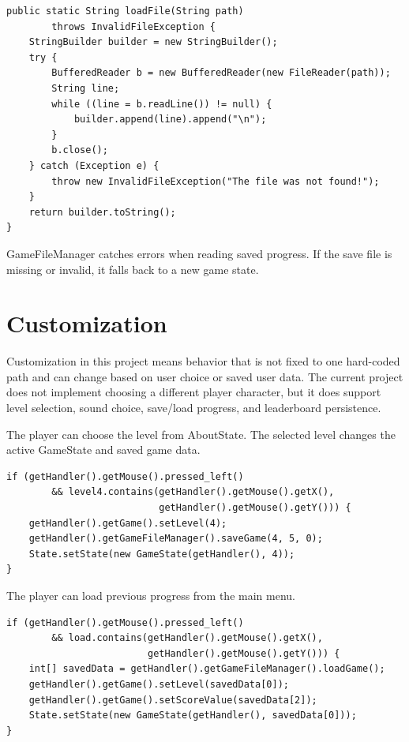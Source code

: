 \documentclass[12pt,a4paper]{article}
\begin{document}
\begin{lstlisting}
public static String loadFile(String path)
        throws InvalidFileException {
    StringBuilder builder = new StringBuilder();
    try {
        BufferedReader b = new BufferedReader(new FileReader(path));
        String line;
        while ((line = b.readLine()) != null) {
            builder.append(line).append("\n");
        }
        b.close();
    } catch (Exception e) {
        throw new InvalidFileException("The file was not found!");
    }
    return builder.toString();
}
\end{lstlisting}

GameFileManager catches errors when reading saved progress. If the save file is missing or invalid, it falls back to a new game state.


\section*{Customization}
Customization in this project means behavior that is not fixed to one hard-coded path and can change based on user choice or saved user data. The current project does not implement choosing a different player character, but it does support level selection, sound choice, save/load progress, and leaderboard persistence.

The player can choose the level from AboutState. The selected level changes the active GameState and saved game data.

\begin{lstlisting}
if (getHandler().getMouse().pressed_left()
        && level4.contains(getHandler().getMouse().getX(),
                           getHandler().getMouse().getY())) {
    getHandler().getGame().setLevel(4);
    getHandler().getGameFileManager().saveGame(4, 5, 0);
    State.setState(new GameState(getHandler(), 4));
}
\end{lstlisting}

The player can load previous progress from the main menu.

\begin{lstlisting}
if (getHandler().getMouse().pressed_left()
        && load.contains(getHandler().getMouse().getX(),
                         getHandler().getMouse().getY())) {
    int[] savedData = getHandler().getGameFileManager().loadGame();
    getHandler().getGame().setLevel(savedData[0]);
    getHandler().getGame().setScoreValue(savedData[2]);
    State.setState(new GameState(getHandler(), savedData[0]));
}
\end{lstlisting}
\end{document}
